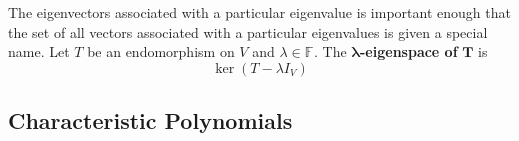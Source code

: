 \documentclass[11pt]{article} %
\newcommand\F[1]{\text{$\mathbb{F^{#1}}$}}
\newcommand\V{\text{$V$}}
\newcommand\0{\text{$\mathbf{0}$}}
\begin{document}
The eigenvectors associated with a particular eigenvalue is important enough that the set of all vectors associated with a particular eigenvalues is given a special name.
{Let $T$ be an endomorphism on $\V$ and $\lambda \in \F{}$. The $\mathbf{\lambda}$\textbf{-eigenspace of }$\mathbf{T}$ is
$$
\ker(T-\lambda I_V)
$$ 
}

\subsection{Characteristic Polynomials}
\end{document}
